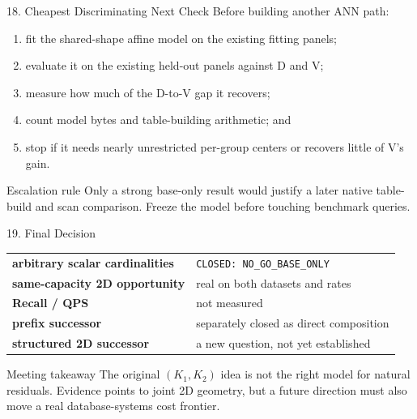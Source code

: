 \documentclass[aspectratio=169]{beamer}
\begin{document}
\begin{frame}{18. Cheapest Discriminating Next Check}
Before building another ANN path:
\begin{enumerate}
  \item fit the shared-shape affine model on the existing fitting panels;
  \item evaluate it on the existing held-out panels against D and V;
  \item measure how much of the D-to-V gap it recovers;
  \item count model bytes and table-building arithmetic; and
  \item stop if it needs nearly unrestricted per-group centers or recovers little of V's gain.
\end{enumerate}
\begin{block}{Escalation rule}
Only a strong base-only result would justify a later native table-build and scan comparison. Freeze the model before touching benchmark queries.
\end{block}
\end{frame}

\begin{frame}{19. Final Decision}
\begin{tabularx}{\textwidth}{>{\bfseries}p{} X}
arbitrary scalar cardinalities & \texttt{CLOSED: NO\_GO\_BASE\_ONLY}\\
same-capacity 2D opportunity & real on both datasets and rates\\
Recall / QPS & not measured\\
prefix successor & separately closed as direct composition\\
structured 2D successor & a new question, not yet established\\
\end{tabularx}
\begin{alertblock}{Meeting takeaway}
The original $(K_1,K_2)$ idea is not the right model for natural residuals. Evidence points to joint 2D geometry, but a future direction must also move a real database-systems cost frontier.
\end{alertblock}
\end{frame}
\end{document}
